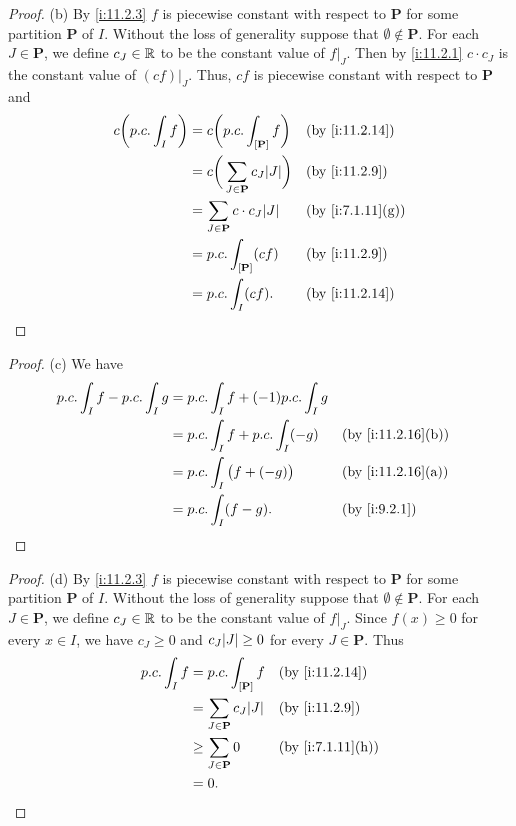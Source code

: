 \begin{proof}{(b)}
  By \cref{i:11.2.3} \(f\) is piecewise constant with respect to \(\mathbf{P}\) for some partition \(\mathbf{P}\) of \(I\).
  Without the loss of generality suppose that \(\emptyset \notin \mathbf{P}\).
  For each \(J \in \mathbf{P}\), we define \(c_J \in \mathbb{R}\) to be the constant value of \(f|_J\).
  Then by \cref{i:11.2.1} \(c \cdot c_J\) is the constant value of \((cf)|_J\).
  Thus, \(cf\) is piecewise constant with respect to \(\mathbf{P}\) and
  \begin{align*}
    c \bigg(p.c. \int_I f\bigg) & = c \bigg(p.c. \int_{[\mathbf{P}]} f\bigg)          &  & \by{i:11.2.14}   \\
                                & = c \bigg(\sum_{J \in \mathbf{P}} c_J \abs{J}\bigg) &  & \by{i:11.2.9}    \\
                                & = \sum_{J \in \mathbf{P}} c \cdot c_J \abs{J}       &  & \by{i:7.1.11}[g] \\
                                & = p.c. \int_{[\mathbf{P}]} (c f)                    &  & \by{i:11.2.9}    \\
                                & = p.c. \int_I (c f).                                &  & \by{i:11.2.14}
  \end{align*}
\end{proof}

\begin{proof}{(c)}
  We have
  \begin{align*}
    p.c. \int_I f - p.c. \int_I g & = p.c. \int_I f + (-1) p.c. \int_I g                        \\
                                  & = p.c. \int_I f + p.c. \int_I (-g)   &  & \by{i:11.2.16}[b] \\
                                  & = p.c. \int_I \big(f + (-g)\big)     &  & \by{i:11.2.16}[a] \\
                                  & = p.c. \int_I (f - g).               &  & \by{i:9.2.1}
  \end{align*}
\end{proof}

\begin{proof}{(d)}
  By \cref{i:11.2.3} \(f\) is piecewise constant with respect to \(\mathbf{P}\) for some partition \(\mathbf{P}\) of \(I\).
  Without the loss of generality suppose that \(\emptyset \notin \mathbf{P}\).
  For each \(J \in \mathbf{P}\), we define \(c_J \in \mathbb{R}\) to be the constant value of \(f|_J\).
  Since \(f(x) \geq 0\) for every \(x \in I\), we have \(c_J \geq 0\) and \(c_J \abs{J} \geq 0\) for every \(J \in \mathbf{P}\).
  Thus
  \begin{align*}
    p.c. \int_I f & = p.c. \int_{[\mathbf{P}]} f          &  & \by{i:11.2.14}   \\
                  & = \sum_{J \in \mathbf{P}} c_J \abs{J} &  & \by{i:11.2.9}    \\
                  & \geq \sum_{J \in \mathbf{P}} 0        &  & \by{i:7.1.11}[h] \\
                  & = 0.
  \end{align*}
\end{proof}


